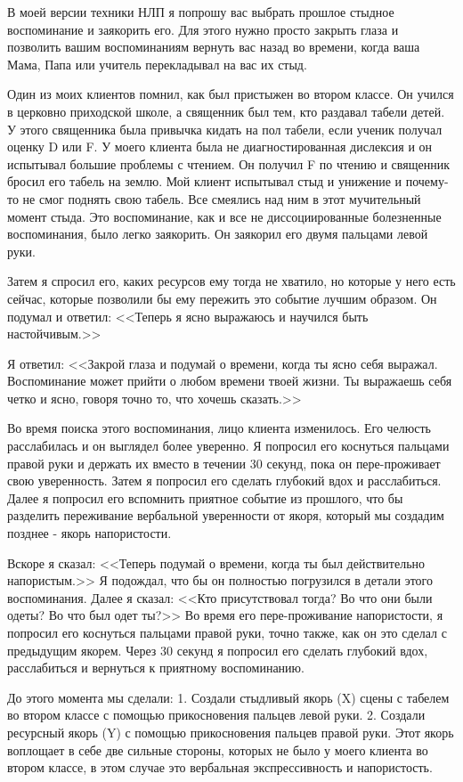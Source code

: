 \documentclass[10pt, fleqn]{article}
\begin{document}
В моей версии техники НЛП я попрошу вас выбрать прошлое стыдное воспоминание и заякорить его. Для этого нужно просто закрыть глаза и позволить вашим воспоминаниям вернуть вас назад во времени, когда ваша Мама, Папа или учитель перекладывал на вас их стыд.

Один из моих клиентов помнил, как был пристыжен во втором классе. Он учился в церковно приходской школе, а священник был тем, кто раздавал табели детей. У этого священника была привычка кидать на пол табели, если ученик получал оценку D или F. У моего клиента была не диагностированная дислексия и он испытывал большие проблемы с чтением. Он получил F по чтению и священник бросил его табель на землю. Мой клиент испытывал стыд и унижение и почему-то не смог поднять свою табель. Все смеялись над ним в этот мучительный момент стыда. Это воспоминание, как и все не диссоциированные болезненные воспоминания, было легко заякорить. Он заякорил его двумя пальцами левой руки.

Затем я спросил его, каких ресурсов ему тогда не хватило, но которые у него есть сейчас, которые позволили бы ему пережить это событие лучшим образом. Он подумал и ответил: <<Теперь я ясно выражаюсь и научился быть настойчивым.>>

Я ответил: <<Закрой глаза и подумай о времени, когда ты ясно себя выражал. Воспоминание может прийти о любом времени твоей жизни. Ты выражаешь себя четко и ясно, говоря точно то, что хочешь сказать.>>

Во время поиска этого воспоминания, лицо клиента изменилось. Его челюсть расслабилась и он выглядел более уверенно. Я попросил его коснуться пальцами правой руки и держать их вместо в течении 30 секунд, пока он пере-проживает свою уверенность. Затем я попросил его сделать глубокий вдох и расслабиться. Далее я попросил его вспомнить приятное событие из прошлого, что бы разделить переживание вербальной уверенности от якоря, который мы создадим позднее - якорь напористости.

Вскоре я сказал: <<Теперь подумай о времени, когда ты был действительно напористым.>> Я подождал, что бы он полностью погрузился в детали этого воспоминания. Далее я сказал: <<Кто присутствовал тогда? Во что они были одеты? Во что был одет ты?>> Во время его пере-проживание напористости, я попросил его коснуться пальцами правой руки, точно также, как он это сделал с предыдущим якорем. Через 30 секунд я попросил его сделать глубокий вдох, расслабиться и вернуться к приятному воспоминанию.

До этого момента мы сделали:
1. Создали стыдливый якорь (X) сцены с табелем во втором классе с помощью прикосновения пальцев левой руки.
2. Создали ресурсный якорь (Y) с помощью прикосновения пальцев правой руки. Этот якорь воплощает в себе две сильные стороны, которых не было у моего клиента во втором классе, в этом случае это вербальная экспрессивность и напористость.
\end{document}

